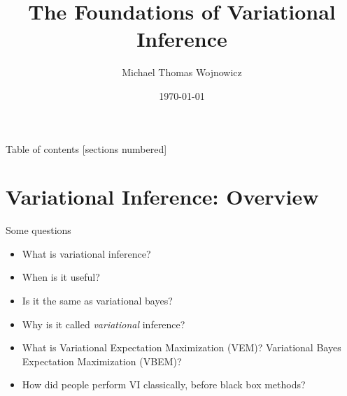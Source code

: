 \documentclass[10pt]{beamer}
\title{The Foundations of Variational Inference}
\date{\today}
\author{Michael Thomas Wojnowicz}
\institute{Data Intensive Studies Center, Tufts University}
\newcommand{\+}[1]{\ensuremath{{\boldsymbol #1}}} %
\begin{document}
\maketitle

\begin{frame}{Table of contents}
  [sections numbered]
  \tableofcontents[hideallsubsections]
\end{frame}


\section{Variational Inference: Overview}

\begin{frame}{Some questions}


\begin{itemize}
\item What is variational inference?
\item When is it useful?

\item Is it the same as variational bayes?

\item Why is it called \textit{variational} inference?

\item What is Variational Expectation Maximization (VEM)?  Variational Bayes Expectation Maximization (VBEM)?

\item How did people perform VI classically, before black box methods?
\end{itemize}



\end{frame}
\end{document}
